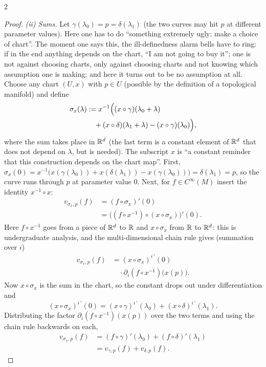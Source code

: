 \begin{paracol}{2}
\begin{proof}
\emph{(ii) Sums.} Let $\gamma(\lambda_0)=p=\delta(\lambda_1)$ (the two curves may hit $p$ at different parameter values). Here one has to do ``something extremely ugly: make a choice of chart''. The moment one says this, the ill-definedness alarm bells have to ring: if in the end anything depends on the chart, ``I am not going to buy it'';
one is not against choosing charts, only against choosing charts and not knowing which assumption one is making; and here it turns out to be no assumption at all. Choose any chart $(U,x)$ with $p\in U$ (possible by the definition of a topological manifold) and define
\[\begin{aligned}
\sigma_x(\lambda)&:=x^{-1}\Bigl((x\circ\gamma)(\lambda_0+\lambda)\\
&\quad+(x\circ\delta)(\lambda_1+\lambda)-(x\circ\gamma)(\lambda_0)\Bigr),
\end{aligned}\]
where the sum takes place in $\mathbb{R}^d$ (the last term is a constant element of $\mathbb{R}^d$ that does not depend on $\lambda$, but is needed). The subscript $x$ is ``a constant reminder that this construction depends on the chart map''. First, $\sigma_x(0)=x^{-1}\bigl(x(\gamma(\lambda_0))+x(\delta(\lambda_1))-x(\gamma(\lambda_0))\bigr)=\delta(\lambda_1)=p$,
so the curve runs through $p$ at parameter value $0$. Next, for $f\in C^\infty(M)$ insert the identity $x^{-1}\circ x$:
\[\begin{aligned}
v_{\sigma_x,p}(f)&=(f\circ\sigma_x)'(0)\\
&=\bigl((f\circ x^{-1})\circ(x\circ\sigma_x)\bigr)'(0).
\end{aligned}\]
Here $f\circ x^{-1}$ goes from a piece of $\mathbb{R}^d$ to $\mathbb{R}$ and $x\circ\sigma_x$ from $\mathbb{R}$ to $\mathbb{R}^d$: this is undergraduate analysis, and the multi-dimensional chain rule gives (summation over $i$)
\[\begin{aligned}
v_{\sigma_x,p}(f)&=(x\circ\sigma_x)^{i\,\prime}(0)\\
&\quad\cdot\partial_i(f\circ x^{-1})\bigl(x(p)\bigr).
\end{aligned}\]
Now $x\circ\sigma_x$ is the sum in the chart, so the constant drops out under differentiation and
\[
  (x\circ\sigma_x)^{i\,\prime}(0)=(x\circ\gamma)^{i\,\prime}(\lambda_0)+(x\circ\delta)^{i\,\prime}(\lambda_1).
\]
Distributing the factor $\partial_i(f\circ x^{-1})(x(p))$ over the two terms and using the chain rule backwards on each,
\[\begin{aligned}
v_{\sigma_x,p}(f)&=(f\circ\gamma)'(\lambda_0)+(f\circ\delta)'(\lambda_1)\\
&=v_{\gamma,p}(f)+v_{\delta,p}(f).

\end{aligned}\]
\end{proof}
\end{paracol}
